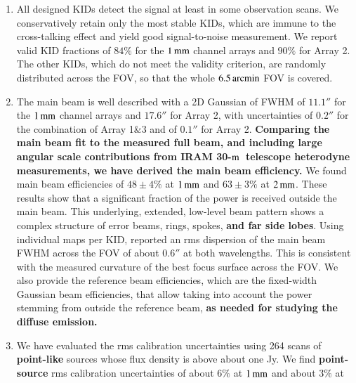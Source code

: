 \documentclass[traditionalabstract]{aa}
\newcommand{\trentemetre}{30-$\rm{m}$}
\newcommand{\lp}[1]{#1}
\newcommand{\rev}[1]{\bf \color[RGB]{0, 153, 255} #1}
\begin{document}
\begin{enumerate}
\item %
  All designed KIDs detect the
  signal at least in some observation
  scans. We conservatively retain only the most stable KIDs, which are
  immune to the cross-talking effect and yield good signal-to-noise
  measurement. 
  We report valid KID fractions of $84\%$
  for the $1\,\rm{mm}$ channel arrays and $90\%$ for Array 2. The other
  KIDs, which do not meet the validity criterion, are randomly
  distributed across the FOV, so that the whole $6.5\,\rm{arcmin}$ FOV is
  covered.
  \vspace{1mm}
\item %
  The main beam is well described with a 2D
  Gaussian of FWHM of $11.1''$ for the $1\,\rm{mm}$ channel arrays
  and $17.6''$ for Array 2, with uncertainties of $0.2''$ for the
  combination of Array 1$\&$3 and of $0.1''$ for Array 2.
  {\rev Comparing the main beam fit to the measured full beam, and 
    including large angular scale contributions from IRAM
    \trentemetre\ telescope heterodyne measurements, we have derived the
  main beam efficiency.}
  We found main beam
  efficiencies of {\rev $48 \pm 4 \%$} at $1\,\rm{mm}$ and {\rev $63 \pm 3 \%$} at
  $2\,\rm{mm}$.
  {\lp These results show that a significant fraction of the power is received
    outside the main beam. This underlying,
    extended, low-level beam pattern shows a complex structure of error 
    beams, rings, spokes, {\rev and far side lobes}.}
  Using individual maps per KID, \citet{Adam2018} reported an rms
  dispersion of the main beam FWHM across the FOV of about $0.6''$ at
  both wavelengths. This is consistent with the measured curvature of
  the best focus surface across the FOV. 
  {\lp We also provide the reference beam efficiencies, which are the
    fixed-width Gaussian beam efficiencies, that allow taking into
    account the power stemming from outside the reference beam, {\rev
      as needed for studying the diffuse emission.}} 
  \vspace{1mm}
\item %
  We have evaluated the rms calibration uncertainties using 264 
  scans of {\rev point-like} sources whose flux density is above about
  one Jy. We find {\rev point-source} rms calibration
  uncertainties of about $6\%$ at $1\,\rm{mm}$ and about $3\%$ at

\end{enumerate}
\end{document}
